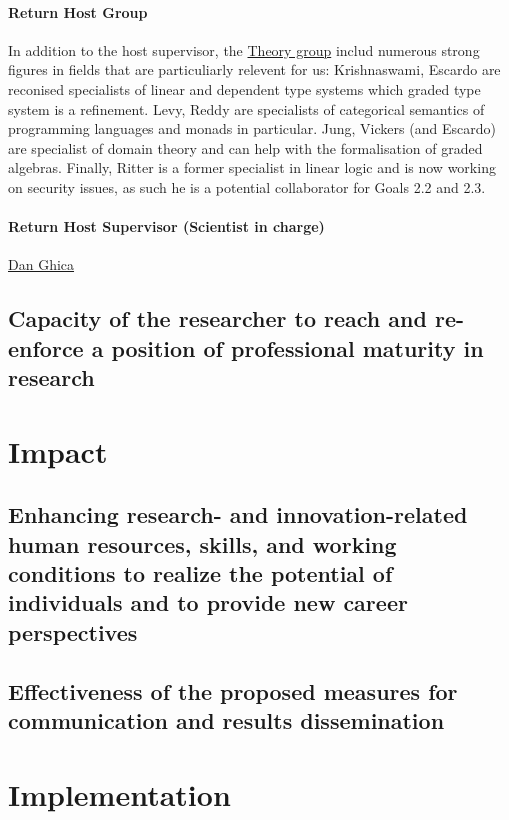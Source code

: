 \documentclass{article}[11pt]
\begin{document}
\paragraph{Return Host Group}
In addition to the host supervisor, the \href{http://www.cs.bham.ac.uk/research/groupings/theory/}{Theory group} includ numerous strong figures in fields that are particuliarly relevent for us: Krishnaswami, Escardo are reconised specialists of linear and dependent type systems which graded type system is a refinement. Levy, Reddy are specialists of categorical semantics of programming languages and monads in particular. Jung, Vickers (and Escardo) are specialist of domain theory and can help with the formalisation of graded algebras. Finally,  Ritter is a former specialist in linear logic and is now working on security issues, as such he is a potential collaborator for Goals 2.2 and 2.3. 

\paragraph{Return Host Supervisor (Scientist in charge)}
\href{http://www.cs.bham.ac.uk/~drg/}{Dan Ghica} 


\subsection{Capacity of the researcher to reach and re-enforce a position of professional maturity in research}



\section{Impact}
\subsection{Enhancing research- and innovation-related human resources, skills, and working conditions to realize the potential of individuals and to provide new career perspectives}



\subsection{Effectiveness of the proposed measures for communication and results dissemination}



\section{Implementation}
\end{document}
